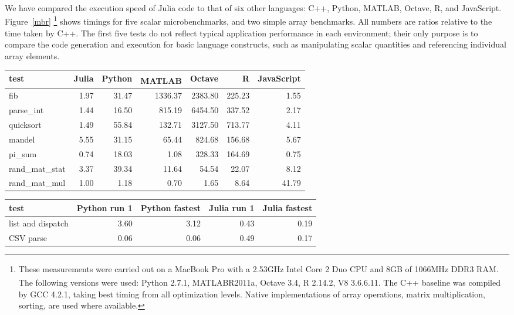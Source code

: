\documentclass[9pt]{sigplanconf}
\newcommand{\Matlab}{MATLAB\textsuperscript{\tiny\textregistered}}
\begin{document}
We have compared the execution speed of Julia code to that of six other
languages: C++, Python, \Matlab, Octave, R, and JavaScript.
Figure~\ref{mbr}
\footnote{
  These measurements were carried out on a MacBook Pro with a 2.53GHz
  Intel Core 2 Duo CPU and 8GB of 1066MHz DDR3 RAM. The following
  versions were used: Python 2.7.1, \Matlab R2011a,
  Octave 3.4, R 2.14.2, V8 3.6.6.11.  The C++ baseline was compiled by
  GCC 4.2.1, taking best timing from all optimization levels.
  Native implementations of array operations, matrix
  multiplication, sorting, are used where available.
}
shows timings for five scalar microbenchmarks, and two
simple array benchmarks. All numbers are ratios relative to
the time taken by C++. The first five tests do not
reflect typical application performance in each environment; their only
purpose is to compare the code generation and execution for basic language
constructs, such as manipulating scalar quantities and referencing individual
array elements.

\begin{figure*}
\caption{Microbenchmark results (times relative to C++)}
\label{mbr}
\begin{center}

\begin{tabular}{|l|r|r|r|r|r|r|}\hline
test & Julia & Python & \Matlab & Octave & R & JavaScript \\
\hline \hline
fib        & 1.97 & 31.47 & 1336.37  & 2383.80 & 225.23 & 1.55 \\
\hline
parse\_int & 1.44 & 16.50 &  815.19  & 6454.50 & 337.52 & 2.17 \\
\hline
quicksort  & 1.49 & 55.84 &  132.71  & 3127.50 & 713.77 & 4.11 \\
\hline
mandel     & 5.55 & 31.15 &   65.44  &  824.68 & 156.68 & 5.67 \\
\hline
pi\_sum    & 0.74 & 18.03 &    1.08  &  328.33 & 164.69 & 0.75 \\
\hline
rand\_mat\_stat & 3.37 & 39.34 & 11.64 & 54.54 &  22.07 & 8.12 \\
\hline
rand\_mat\_mul  & 1.00 &  1.18 &  0.70 &  1.65 &   8.64 & 41.79 \\
\hline
\end{tabular}

\vspace{0.5cm}

\caption{Task-level benchmark results (times in seconds)}
\begin{tabular}{|l|r|r|r|r|}\hline
test              & Python run 1 & Python fastest & Julia run 1 & Julia fastest\\
\hline \hline
list and dispatch & 3.60         & 3.12           & 0.43        & 0.19 \\
\hline
CSV parse         & 0.06         & 0.06           & 0.49        & 0.17 \\
\hline
\end{tabular}

\end{center}
\end{figure*}
\end{document}
